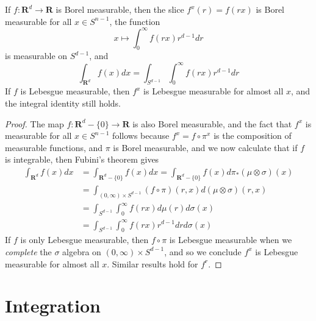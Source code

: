 \begin{theorem}
    If $f: \mathbf{R}^d \to \mathbf{R}$ is Borel measurable, then the slice $f^x(r) = f(rx)$ is Borel measurable for all $x \in S^{n-1}$, the function
    \[ x \mapsto \int_0^\infty f(rx) r^{d-1}dr \]
    is measurable on $S^{d-1}$, and
    \[ \int_{\mathbf{R}^d} f(x) dx = \int_{S^{d-1}} \int_0^\infty f(rx) r^{d-1} dr \]
    If $f$ is Lebesgue measurable, then $f^x$ is Lebesgue measurable for almost all $x$, and the integral identity still holds.
\end{theorem}
\begin{proof}
    The map $f: \mathbf{R}^d - \{ 0 \} \to \mathbf{R}$ is also Borel measurable, and the fact that $f^x$ is measurable for all $x \in S^{n-1}$ follows because $f^x = f \circ \pi^x$ is the composition of measurable functions, and $\pi$ is Borel measurable, and we now calculate that if $f$ is integrable, then Fubini's theorem gives
    \begin{align*}
        \int_{\mathbf{R}^d} f(x) dx &= \int_{\mathbf{R}^d - \{ 0 \}} f(x) dx = \int_{\mathbf{R}^d - \{ 0 \}} f(x) d\pi_*(\mu \otimes \sigma)(x)\\
        &= \int_{(0,\infty) \times S^{d-1}} (f \circ \pi)(r,x) d(\mu \otimes \sigma)(r,x)\\
        &= \int_{S^{d-1}} \int_0^\infty f(rx) d\mu(r) d\sigma(x)\\
        &= \int_{S^{d-1}} \int_0^\infty f(rx) r^{d-1} dr d\sigma(x)
    \end{align*}
    If $f$ is only Lebesgue measurable, then $f \circ \pi$ is Lebesgue measurable when we {\it complete} the $\sigma$ algebra on $(0,\infty) \times S^{d-1}$, and so we conclude $f^x$ is Lebesgue measurable for almost all $x$. Similar results hold for $f^r$.
\end{proof}

\chapter{Integration}

